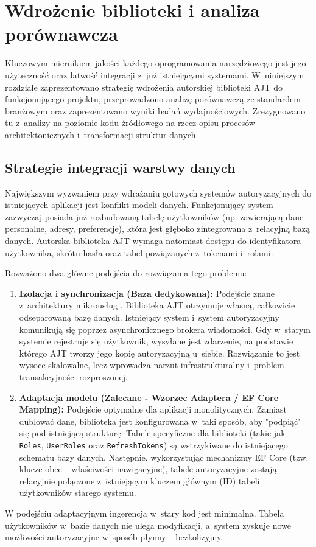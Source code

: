 \documentclass{SGGW-thesis}
\begin{document}
\startchapterfromoddpage
\chapter{Wdrożenie biblioteki i analiza porównawcza}

Kluczowym miernikiem jakości każdego oprogramowania narzędziowego jest jego użyteczność oraz łatwość integracji z~już istniejącymi systemami. W~niniejszym rozdziale zaprezentowano strategię wdrożenia autorskiej biblioteki AJT do funkcjonującego projektu, przeprowadzono analizę porównawczą ze standardem branżowym oraz zaprezentowano wyniki badań wydajnościowych. Zrezygnowano tu z~analizy na poziomie kodu źródłowego na rzecz opisu procesów architektonicznych i~transformacji struktur danych.

\section{Strategie integracji warstwy danych}

Największym wyzwaniem przy wdrażaniu gotowych systemów autoryzacyjnych do istniejących aplikacji jest konflikt modeli danych. Funkcjonujący system zazwyczaj posiada już rozbudowaną tabelę użytkowników (np. zawierającą dane personalne, adresy, preferencje), która jest głęboko zintegrowana z~relacyjną bazą danych. Autorska biblioteka AJT wymaga natomiast dostępu do identyfikatora użytkownika, skrótu hasła oraz tabel powiązanych z~tokenami i~rolami.

Rozważono dwa główne podejścia do rozwiązania tego problemu:
\begin{enumerate}
    \item \textbf{Izolacja i synchronizacja (Baza dedykowana):} Podejście znane z~architektury mikrousług \cite{fowler2002}. Biblioteka AJT otrzymuje własną, całkowicie odseparowaną bazę danych. Istniejący system i~system autoryzacyjny komunikują się poprzez asynchronicznego brokera wiadomości. Gdy w~starym systemie rejestruje się użytkownik, wysyłane jest zdarzenie, na podstawie którego AJT tworzy jego kopię autoryzacyjną u~siebie. Rozwiązanie to jest wysoce skalowalne, lecz wprowadza narzut infrastrukturalny i~problem transakcyjności rozproszonej.
    
    \item \textbf{Adaptacja modelu (Zalecane - Wzorzec Adaptera / EF Core Mapping):} Podejście optymalne dla aplikacji monolitycznych. Zamiast dublować dane, biblioteka jest konfigurowana w~taki sposób, aby "podpiąć" się pod istniejącą strukturę. Tabele specyficzne dla biblioteki (takie jak \texttt{Roles}, \texttt{UserRoles} oraz \texttt{RefreshTokens}) są wstrzykiwane do istniejącego schematu bazy danych. Następnie, wykorzystując mechanizmy EF Core \cite{ms_ef} (tzw. klucze obce i~właściwości nawigacyjne), tabele autoryzacyjne zostają relacyjnie połączone z~istniejącym kluczem głównym (ID) tabeli użytkowników starego systemu. 
\end{enumerate}
\clearpage
W podejściu adaptacyjnym ingerencja w~stary kod jest minimalna. Tabela użytkowników w~bazie danych nie ulega modyfikacji, a~system zyskuje nowe możliwości autoryzacyjne w~sposób płynny i~bezkolizyjny.
\end{document}
